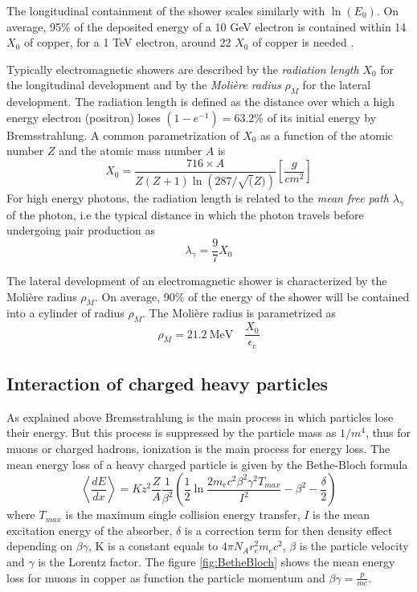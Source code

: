 The longitudinal containment of the shower scales similarly with $\ln\left(E_0\right)$. On average, 95\% of the deposited energy of a 10 GeV electron is contained within 14 $X_0$ of copper, for a 1 TeV electron, around 22 $X_0$ of copper is needed \cite{Wigmans:392793}.

Typically electromagnetic showers are described by the \textit{radiation length} $X_0$ for the longitudinal development and by the \textit{Moli\`ere radius} $\rho_{M}$ for the lateral development. The radiation length is defined as the distance over which a high energy electron (positron) loses $(1 - e^{-1}) = 63.2\%$ of its initial energy by Bremsstrahlung. A common parametrization of $X_0$ as a function of the atomic number $Z$ and the atomic mass number $A$ is \cite{Wigmans:392793}
\begin{equation}
  X_0 = \frac{716 \times A}{Z(Z+1)\ln\left(287/\sqrt(Z)\right)} [\frac{g}{cm^2}]
\end{equation}
For high energy photons, the radiation length is related to the \textit{mean free path} $\lambda_{\gamma}$ of the photon, i.e the typical distance in which the photon travels before undergoing pair production as
\begin{equation}
  \lambda_{\gamma} = \frac{9}{7} X_0
\end{equation}

The lateral development of an electromagnetic shower is characterized by the Moli\`ere radius $\rho_{M}$. On average, 90\% of the energy of the shower will be contained into a cylinder of radius $\rho_{M}$. The Moli\`ere radius is parametrized as \cite{Wigmans:392793}
\begin{equation}
  \rho_{M} = \SI{21.2}{\mega\eV} \quad \frac{X_0}{\epsilon_c}
\end{equation}

\subsection{Interaction of charged heavy particles}
\label{sec:InteracHeavyPart}

As explained above Bremsstrahlung is the main process in which particles lose their energy. But this process is suppressed by the particle mass as $1/m^4$, thus for muons or charged hadrons, ionization is the main process for energy loss. The mean energy loss of a heavy charged particle is given by the Bethe-Bloch formula \cite{Wigmans:392793}
\begin{equation}
  \left<\frac{dE}{dx}\right> = Kz^2\frac{Z}{A}\frac{1}{\beta^2}\left(\frac{1}{2}\ln\frac{2m_ec^2\beta^2\gamma^2T_{max}}{I^2} - \beta^2 - \frac{\delta}{2}\right)
\end{equation}
where $T_{max}$ is the maximum single collision energy transfer, $I$ is the mean excitation energy of the absorber, $\delta$ is a correction term for then density effect depending on $\beta\gamma$, K is a constant equals to $4\pi{}N_Ar_e^2m_ec^2$, $\beta$ is the particle velocity and $\gamma$ is the Lorentz factor. The figure \ref{fig:BetheBloch} shows the mean energy loss for muons in copper as function the particle momentum and $\beta\gamma = \frac{p}{mc}$.

